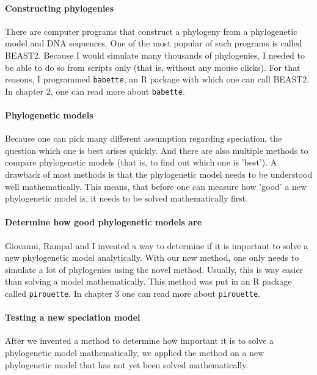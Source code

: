 \paragraph{Constructing phylogenies}

There are computer programs that construct a phylogeny from a
phylogenetic model and DNA sequences.
One of the most popular of such programs is called BEAST2.
Because I would simulate many thousands of phylogenies,
I needed to be able to do so from scripts only (that is,
without any mouse clicks). For that reasons, I programmed
\verb;babette;, an R package with which one can call BEAST2.
In chapter 2, one can read more about \verb;babette;.

\paragraph{Phylogenetic models}

Because one can pick many different assumption regarding speciation,
the question which one is best arises quickly.
And there are also multiple methods to compare 
phylogenetic models (that is, to find out which one is 'best').
A drawback of most methods is that the phylogenetic model
needs to be understood well mathematically.
This means, that before one can measure how 'good' a new
phylogenetic model is, it needs to be solved mathematically first.

\paragraph{Determine how good phylogenetic models are}

Giovanni, Rampal and I invented a way to determine if
it is important to solve a new phylogenetic model analytically.
With our new method, one only needs to simulate a lot
of phylogenies using the novel method.
Usually, this is way easier than solving a model mathematically.
This method was put in an R package called \verb;pirouette;. 
In chapter 3 one can read more about \verb;pirouette;.

\paragraph{Testing a new speciation model}

After we invented a method to determine how important it is
to solve a phylogenetic model mathematically, we applied
the method on a new phylogenetic model that has not yet been
solved mathematically.

